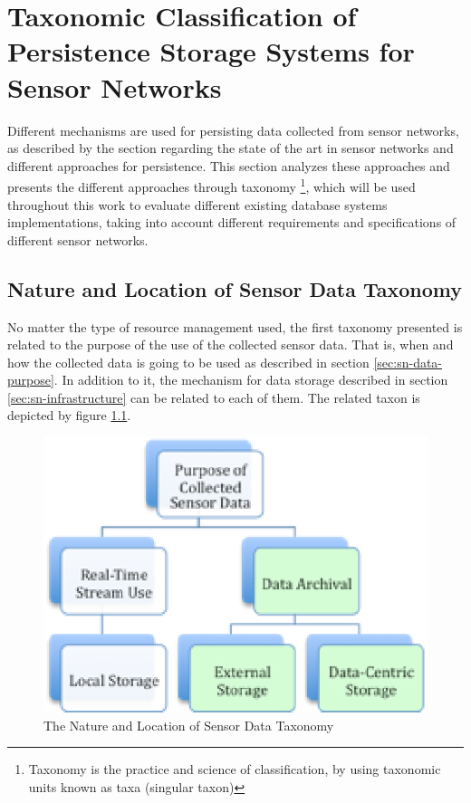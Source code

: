 

\chapter{Taxonomic Classification of Persistence Storage Systems for Sensor
Networks}
\label{chap:taxonomies}

Different mechanisms are used for persisting data collected from sensor
networks, as described by the section regarding the state of the art in sensor
networks and different approaches for persistence. This section analyzes these
approaches and presents the different approaches through taxonomy
\footnote{Taxonomy is the practice and science of classification, by using
taxonomic units known as taxa (singular taxon)}, which will be used throughout
this work to evaluate different existing database systems implementations,
taking into account different requirements and specifications of different
sensor networks.

\section{Nature and Location of Sensor Data Taxonomy}

No matter the type of resource management used, the first taxonomy presented is
related to the purpose of the use of the collected sensor data. That is, when
and how the collected data is going to be used as described in section
\ref{sec:sn-data-purpose}. In addition to it, the mechanism for data storage
described in section \ref{sec:sn-infrastructure} can be related to each of
them. The related taxon is depicted by figure \ref{fig:taxonomy-data-purpose}.

\begin{figure}[h]
  \centering
  \includegraphics{../diagrams/taxonomy-data-purpose}
  \caption{The Nature and Location of Sensor Data Taxonomy}
  \label{fig:taxonomy-data-purpose}
\end{figure}

